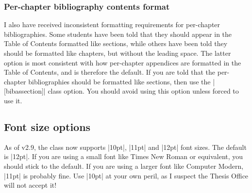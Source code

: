 \documentclass[11pt]{article}
\begin{document}
\subsubsection{Per-chapter bibliography contents format}
I also have received inconsistent formatting requirements for per-chapter bibliographies. Some students have been told that they should appear in the Table of Contents formatted like sections, while others have been told they should be formatted like chapters, but without the leading space. The latter option is most consistent with how per-chapter appendices are formatted in the Table of Contents, and is therefore the default. If you are told that the per-chapter bibliographies should be formatted like sections, then use the |[bibassection]| class option. You should avoid using this option unless forced to use it.  
\subsection{Font size options}\label{fontsize}
As of v2.9, the class now supports |10pt|, |11pt| and |12pt| font sizes. The default is |12pt|. If you are using a small font like Times New Roman or equivalent, you should stick to the default. If you are using a larger font like Computer Modern, |11pt| is probably fine. Use |10pt| at your own peril, as I suspect the Thesis Office will not accept it!
\end{document}
